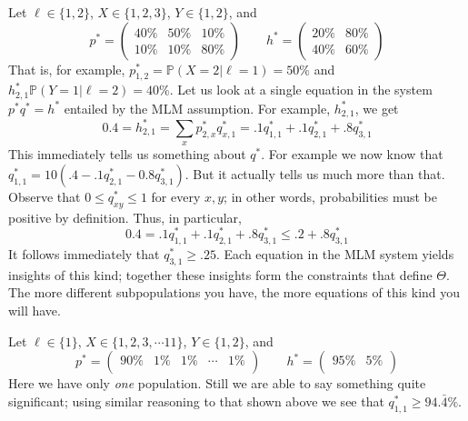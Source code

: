 \begin{example}
Let $\ell \in \{1,2\}$, $X\in \{1,2,3\}$, $Y\in \{1,2\}$, and 
\[
p^{*}=\left(\begin{array}{ccc}
40\% & 50\% & 10\% \\
10\% & 10\% & 80\%
\end{array}\right)\qquad h^{*}=\left(\begin{array}{cc}
20\% & 80\% \\
40\% & 60\%
\end{array}\right)
\]
That is, for example, $p^*_{1,2}=\mathbb{P}(X=2|\ell=1)=50\%$ and $h^*_{2,1}\mathbb{P}(Y=1|\ell=2)=40\%$.  Let us look at a single equation in the system $p^* q^* = h^*$ entailed by the MLM assumption.  For example, $h^*_{2,1}$, we get
\[
0.4 = h^*_{2,1} = \sum_x p^*_{2,x} q^*_{x,1} = .1 q^*_{1,1} + .1 q^*_{2,1} + .8 q^*_{3,1} 
\]
This immediately tells us something about $q^*$.  For example we now know that $q^*_{1,1} = 10(.4 - .1 q^*_{2,1} - 0.8 q^*_{3,1})$.  But it actually tells us much more than that.  Observe that $0\leq q^*_{xy}\leq 1$ for every $x,y$; in other words, probabilities must be positive by definition.  Thus, in particular,
\[
0.4 = .1 q^*_{1,1} + .1 q^*_{2,1} + .8 q^*_{3,1} \leq .2 + .8 q^*_{3,1}
\]
It follows immediately that $q^*_{3,1}\geq .25$.  Each equation in the MLM system yields insights of this kind; together these insights form the constraints that define $\Theta$.  The more different subpopulations you have, the more equations of this kind you will have.  
\end{example}

\vspace{.1in}

\begin{example}
Let $\ell \in \{1\}$, $X\in \{1,2,3,\cdots 11\}$, $Y\in \{1,2\}$, and 
\[
p^{*}=\left(\begin{array}{ccccc}
90\% & 1\% & 1\% & \cdots & 1\% \\
\end{array}\right)\qquad h^{*}=\left(\begin{array}{cc}
95\% & 5\% \\
\end{array}\right)
\]
Here we have only \emph{one} population.  Still we are able to say something quite significant; using similar reasoning to that shown above we see that $q^*_{1,1}\geq 94.\bar4\%$.  
\end{example}

\vspace{.1in}

